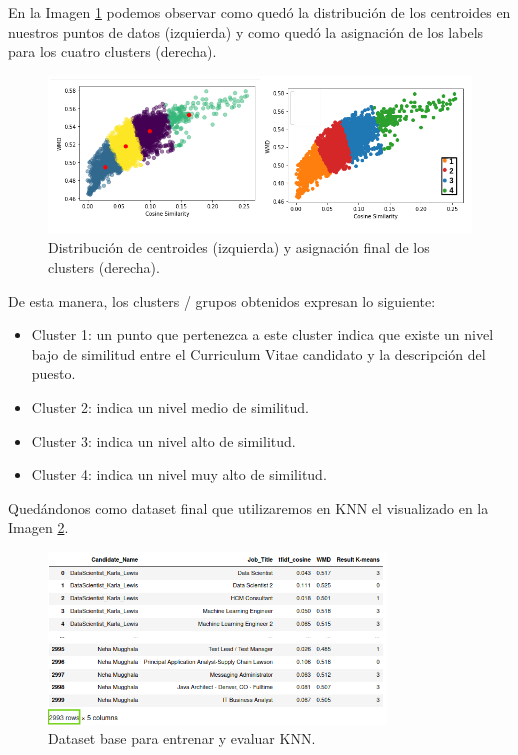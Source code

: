 \documentclass[12pt,a4paper]{article}
\begin{document}
\begin{sloppypar}
En la Imagen \ref{fig:final_groups} podemos observar como quedó la distribución de los centroides en nuestros puntos de datos (izquierda) y como quedó la asignación de los labels para los cuatro clusters (derecha). 

\begin{figure}[H]   
\centering
\includegraphics[width=1\textwidth]{images/implementacion_5/final_groups.png}
\captionsetup{justification=centering,margin=2cm}
\caption{Distribución de centroides (izquierda) y asignación final de los clusters (derecha).}
\label{fig:final_groups}
\end{figure}

De esta manera, los clusters / grupos obtenidos expresan lo siguiente:
\begin{itemize}
\item Cluster 1: un punto que pertenezca a este cluster indica que existe un nivel bajo de similitud entre el Curriculum Vitae candidato y la descripción del puesto.
\item Cluster 2: indica un nivel medio de similitud.
\item Cluster 3: indica un nivel alto de similitud.
\item Cluster 4: indica un nivel muy alto de similitud. 
\end{itemize}

Quedándonos como dataset final que utilizaremos en KNN el visualizado en la Imagen \ref{fig:to_knn}.

\begin{figure}[H]   
\centering
\includegraphics[width=0.8\textwidth]{images/implementacion_5/to_knn.png}
\captionsetup{justification=centering,margin=2cm}
\caption{Dataset base para entrenar y evaluar KNN.\\}
\label{fig:to_knn}
\end{figure}


\end{sloppypar}
\end{document}
